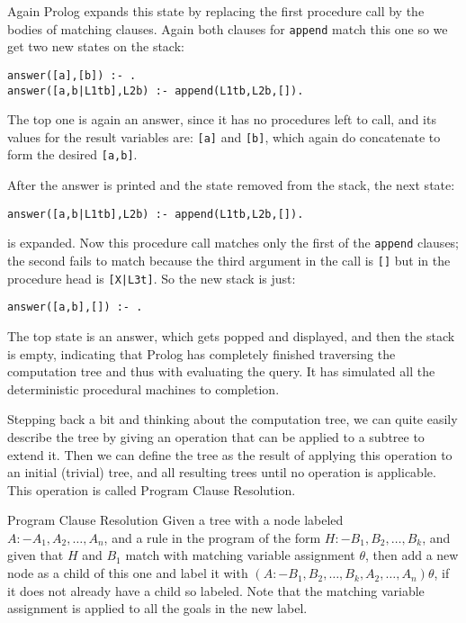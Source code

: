 Again Prolog expands this state by replacing the first procedure call
by the bodies of matching clauses.  Again both clauses for
\verb|append| match this one so we get two new states on the stack:
\begin{verbatim}
answer([a],[b]) :- .
answer([a,b|L1tb],L2b) :- append(L1tb,L2b,[]).
\end{verbatim}

The top one is again an answer, since it has no procedures left to
call, and its values for the result variables are: \verb|[a]| and
\verb|[b]|, which again do concatenate to form the desired
\verb|[a,b]|.

After the answer is printed and the state removed from the stack, the
next state:
\begin{verbatim}
answer([a,b|L1tb],L2b) :- append(L1tb,L2b,[]).
\end{verbatim}
is expanded.  Now this procedure call matches only the first of the
\verb|append| clauses; the second fails to match because the third
argument in the call is \verb|[]| but in the procedure head is
\verb^[X|L3t]^.  So the new stack is just:
\begin{verbatim}
answer([a,b],[]) :- .
\end{verbatim}
The top state is an answer, which gets popped and displayed, and then
the stack is empty, indicating that Prolog has completely finished
traversing the computation tree and thus with evaluating the query.  It has
simulated all the deterministic procedural machines to completion.

Stepping back a bit and thinking about the computation tree, we can quite
easily describe the tree by giving an operation that can be applied to
a subtree to extend it.  Then we can define the tree as the result
of applying this operation to an initial (trivial) tree, and all
resulting trees until no operation is applicable.  This operation is
called {\sc Program Clause Resolution}.

\begin{definition} {Program Clause Resolution} \label{def:pcrsld}
Given a tree with a node labeled \\ $A :- A_1, A_2, \ldots, A_n$, and
a rule in the program of the form $H :- B_1, B_2, \ldots, B_k$, and
given that $H$ and $B_1$ match with matching variable assignment
$\theta$, then add a new node as a child of this one and label it with
$(A :- B_1, B_2, \ldots, B_k, A_2, \ldots, A_n)\theta$, if it does not
already have a child so labeled.  Note that the matching variable
assignment is applied to all the goals in the new label.
\end{definition}


